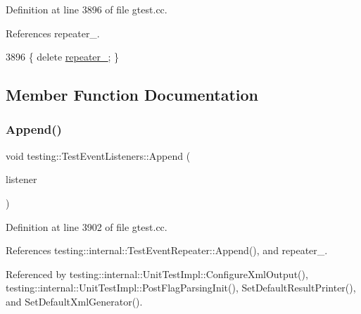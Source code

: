 Definition at line 3896 of file gtest.\+cc.



References repeater\+\_\+.


\begin{DoxyCode}
3896 \{ \textcolor{keyword}{delete} \hyperlink{classtesting_1_1TestEventListeners_a625d58b951893e80cde12862aece6fd8}{repeater\_}; \}
\end{DoxyCode}


\subsection{Member Function Documentation}
\mbox{\label{classtesting_1_1TestEventListeners_a1207dce74d64c1c39ffa6105560536a0}} 
\subsubsection{\texorpdfstring{Append()}{Append()}}
{\footnotesize\ttfamily void testing\+::\+Test\+Event\+Listeners\+::\+Append (\begin{DoxyParamCaption}\item[{\hyperlink{classtesting_1_1TestEventListener}{Test\+Event\+Listener} $\ast$}]{listener }\end{DoxyParamCaption})}



Definition at line 3902 of file gtest.\+cc.



References testing\+::internal\+::\+Test\+Event\+Repeater\+::\+Append(), and repeater\+\_\+.



Referenced by testing\+::internal\+::\+Unit\+Test\+Impl\+::\+Configure\+Xml\+Output(), testing\+::internal\+::\+Unit\+Test\+Impl\+::\+Post\+Flag\+Parsing\+Init(), Set\+Default\+Result\+Printer(), and Set\+Default\+Xml\+Generator().


